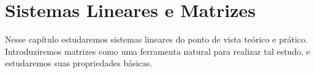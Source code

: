 \chapter{Sistemas Lineares e Matrizes}
Nesse capítulo estudaremos sistemas lineares do ponto de vista teórico e prático.
Introduziremos matrizes como uma ferramenta natural para realizar tal estudo, e estudaremos suas propriedades básicas.






